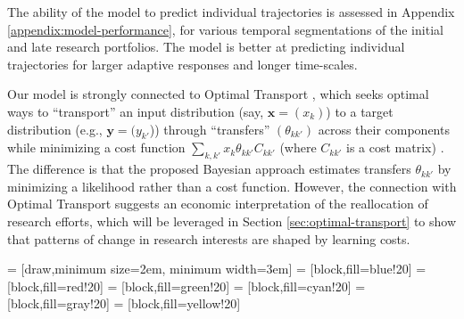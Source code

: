 \documentclass{article}
\begin{document}
The ability of the model to predict individual trajectories is assessed in Appendix \ref{appendix:model-performance}, for various temporal segmentations of the initial and late research portfolios. The model is better at predicting individual trajectories for larger adaptive responses and longer time-scales.  %

Our model is strongly connected to Optimal Transport \citep{muzellec2017tsallis,li2019learning}, which seeks optimal ways to  ``transport'' an input distribution (say, $\bm{x}=(x_k)$) to a target distribution (e.g., $\bm{y}=(y_{k'}$)) through ``transfers'' $(\theta_{kk'})$ across their components while minimizing a cost function $\sum_{k,k'} x_{k} \theta_{kk'}C_{kk'}$ (where $C_{kk'}$ is a cost matrix) \citep{Peyr2019}. The difference is that the proposed Bayesian approach estimates transfers $\theta_{kk'}$ by minimizing a likelihood rather than a cost function. However, the connection with Optimal Transport suggests an economic interpretation of the reallocation of research efforts, which will be leveraged in Section \ref{sec:optimal-transport} to show that patterns of change in research interests are shaped by learning costs. %


     = [draw,minimum size=2em, minimum width=3em]
     = [block,fill=blue!20]
     = [block,fill=red!20]
     = [block,fill=green!20]
     = [block,fill=cyan!20]
     = [block,fill=gray!20]
     = [block,fill=yellow!20]
    
\end{document}
